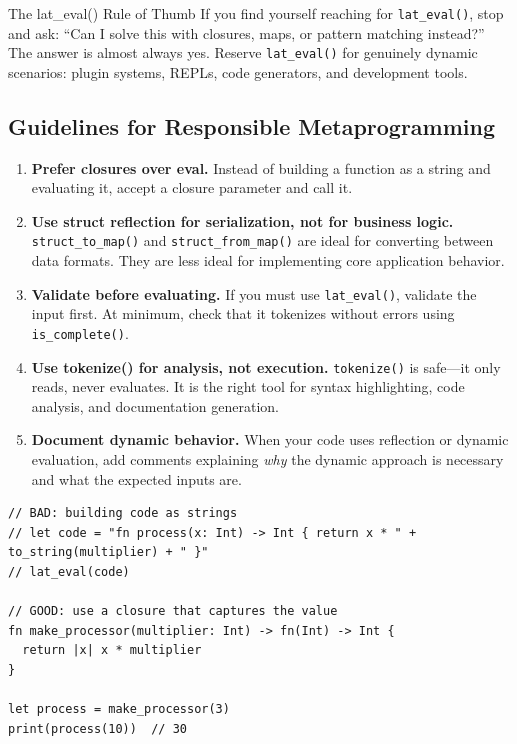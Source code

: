 \begin{warnbox}{The lat\_eval() Rule of Thumb}
If you find yourself reaching for \lstinline|lat_eval()|, stop and ask: ``Can I solve this with closures, maps, or pattern matching instead?''
The answer is almost always yes.
Reserve \lstinline|lat_eval()| for genuinely dynamic scenarios: plugin systems, REPLs, code generators, and development tools.
\end{warnbox}

\subsection{Guidelines for Responsible Metaprogramming}

\begin{enumerate}
  \item \textbf{Prefer closures over eval.}
        Instead of building a function as a string and evaluating it,
        accept a closure parameter and call it.

  \item \textbf{Use struct reflection for serialization, not for business logic.}
        \lstinline|struct_to_map()| and \lstinline|struct_from_map()| are ideal
        for converting between data formats. They are less ideal for implementing
        core application behavior.

  \item \textbf{Validate before evaluating.}
        If you must use \lstinline|lat_eval()|, validate the input first.
        At minimum, check that it tokenizes without errors using
        \lstinline|is_complete()|.

  \item \textbf{Use tokenize() for analysis, not execution.}
        \lstinline|tokenize()| is safe---it only reads, never evaluates.
        It is the right tool for syntax highlighting, code analysis, and
        documentation generation.

  \item \textbf{Document dynamic behavior.}
        When your code uses reflection or dynamic evaluation, add comments
        explaining \emph{why} the dynamic approach is necessary and what
        the expected inputs are.
\end{enumerate}

\begin{lstlisting}[language=Lattice, caption={Closures instead of eval: the better way}]
// BAD: building code as strings
// let code = "fn process(x: Int) -> Int { return x * " + to_string(multiplier) + " }"
// lat_eval(code)

// GOOD: use a closure that captures the value
fn make_processor(multiplier: Int) -> fn(Int) -> Int {
  return |x| x * multiplier
}

let process = make_processor(3)
print(process(10))  // 30
\end{lstlisting}

